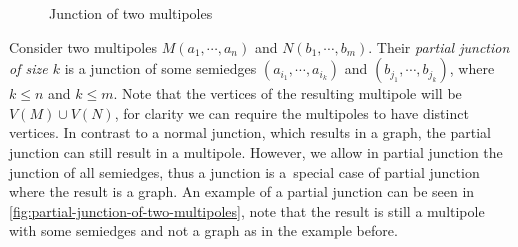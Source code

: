 \documentclass[12pt, twoside]{book}
\begin{document}
\begin{figure}
	\caption{Junction of two multipoles}
	\label{fig:junction-of-two-multipoles}
\end{figure}

Consider two multipoles $M(a_1,\cdots,a_n)$ and $N(b_1,\cdots,b_m)$. Their \textit{partial junction of size $k$} is a junction of some semiedges $(a_{i_1},\cdots, a_{i_k})$ and $(b_{j_1},\cdots, b_{j_k})$, where $k\leq n$ and $k\leq m$. Note that the vertices of the resulting multipole will be $V(M)\cup V(N)$, for clarity we can require the multipoles to have distinct vertices. In contrast to a normal junction, which results in a graph, the partial junction can still result in a multipole. However, we allow in partial junction the junction of all semiedges, thus a junction is a~special case of partial junction where the result is a graph. An example of a partial junction can be seen in \cref{fig:partial-junction-of-two-multipoles}, note that the result is still a multipole with some semiedges and not a graph as in the example before.
\end{document}
